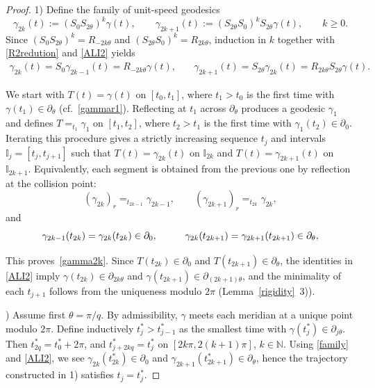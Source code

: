 \documentclass[11pt,a4paper,times]{amsart}
\theoremstyle{plain}
\theoremstyle{definition}
\numberwithin{equation}{section}
\newcommand{\eqskip}{ \vspace*{2mm}\\ }
\newcommand{\N}{\mathbb{N}}
\begin{document}
\begin{proof}
1) Define the family of unit-speed geodesics
\[
\gamma_{2k}(t):=(S_0S_{2\theta})^k\gamma(t),\qquad
\gamma_{2k+1}(t):=(S_{2\theta}S_0)^kS_{2\theta}\gamma(t),\qquad k\ge0.
\]
Since $(S_0S_{2\theta})^k=R_{-2k\theta}$ and $(S_{2\theta}S_0)^k=R_{2k\theta}$, induction in $k$
together with \eqref{R2redution} and \eqref{ALI2} yields
\begin{equation}\label{family}
\begin{array}{ll}
\gamma_{2k}(t)=S_0\gamma_{2k-1}(t)=R_{-2k\theta}\gamma(t), &\quad
\gamma_{2k+1}(t)=S_{2\theta}\gamma_{2k}(t)=R_{2k\theta}S_{2\theta}\gamma(t).
\end{array}
\end{equation}

We start with $T(t)=\gamma(t)$ on $[t_0,t_1]$, where $t_1>t_0$ is the first time with
$\gamma(t_1)\in\partial_\theta$ (cf.\ \eqref{gammar1}). Reflecting at $t_1$ across $\partial_\theta$
produces a geodesic $\gamma_1$ and defines $T=_{t_1}\gamma_1$ on $[t_1,t_2]$, where $t_2>t_1$ is the
first time with $\gamma_1(t_2)\in\partial_0$. Iterating this procedure gives a strictly increasing
sequence $t_j$ and intervals $\mathbb{I}_j=[t_j,t_{j+1}]$ such that
$T(t)=\gamma_{2k}(t)$ on $\mathbb{I}_{2k}$ and $T(t)=\gamma_{2k+1}(t)$ on $\mathbb{I}_{2k+1}$.
Equivalently, each segment is obtained from the previous one by reflection at the collision point:
\[
(\gamma_{2k})_r=_{t_{2k-1}}\gamma_{2k-1},\qquad
(\gamma_{2k+1})_r=_{t_{2k}}\gamma_{2k},\]
and
\[
\begin{array}{ll}
\gamma_{2k-1}(t_{2k})=\gamma_{2k}(t_{2k})\in\partial_0,
&\qquad \gamma_{2k}(t_{2k+1})=\gamma_{2k+1}(t_{2k+1})\in\partial_\theta,
\eqskip
\end{array}
\]
This proves~\eqref{gamma2k}. Since $T(t_{2k})\in\partial_0$ and
$T(t_{2k+1})\in\partial_\theta$, the identities in \eqref{ALI2} imply
$\gamma(t_{2k})\in\partial_{2k\theta}$ and $\gamma(t_{2k+1})\in\partial_{(2k+1)\theta}$, and the
minimality of each $t_{j+1}$ follows from the uniqueness modulo $2\pi$ (Lemma~\ref{rigidity}~3)).

) Assume first $\theta=\pi/q$. By admissibility, $\gamma$ meets each meridian at a unique point
modulo $2\pi$. Define inductively $t^*_j>t^*_{j-1}$ as the smallest time with
$\gamma(t^*_j)\in\partial_{j\theta}$. Then $t^*_{2q}=t^*_0+2\pi$, and
$t^*_{j+2kq}=t^*_j$ on $[2k\pi,2(k+1)\pi]$, $k\in\N$. Using \eqref{family} and \eqref{ALI2}, we see
$\gamma_{2k}(t^*_{2k})\in\partial_0$ and $\gamma_{2k+1}(t^*_{2k+1})\in\partial_\theta$, hence the
trajectory constructed in 1) satisfies $t_j=t^*_j$.


\end{proof}
\end{document}
